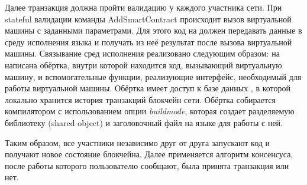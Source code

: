 Далее транзакция должна пройти валидацию у каждого участника сети.
При stateful валидации команды Add\-Smart\-Con\-tract происходит вызов виртуальной машины  с заданными параметрами.
Для этого код на  должен передавать данные в среду исполнения языка  и получать из неё результат после вызова виртуальной машины.
Связывание сред исполнения реализовано следующим образом: на  написана обёртка, внутри которой находится код, вызывающий виртуальную машину, и вспомогательные функции, реализующие интерфейс, необходимый для работы виртуальной машины.
Обёртка имеет доступ к базе данных , в которой локально хранится история транзакций блокчейн сети.
Обёртка собирается компилятором  с использованием опции \emph{buildmode}, которая создает разделяемую библиотеку (shared object) и заголовочный файл на языке  для работы с ней.

Таким образом, все участники независимо друг от друга запускают код и получают новое состояние блокчейна.
Далее применяется алгоритм консенсуса, после работы которого пользователю сообщают, была принята транзакция или нет.